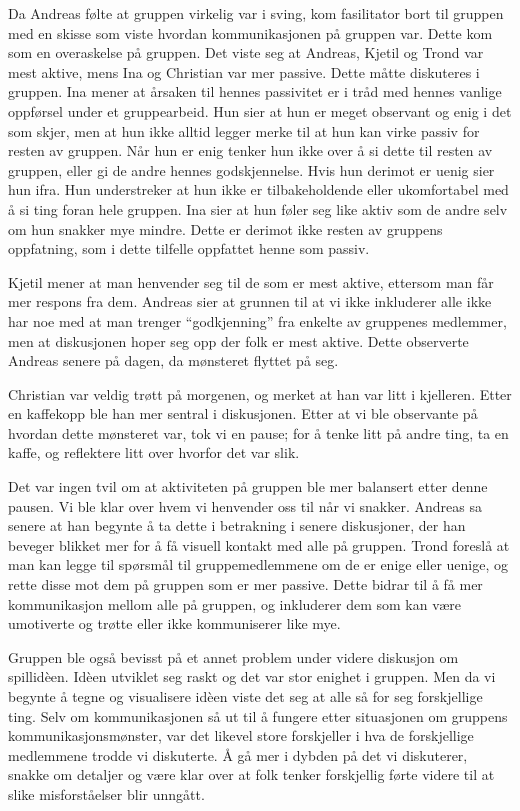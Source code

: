 Da Andreas følte at gruppen virkelig var i sving, kom fasilitator bort til gruppen med en skisse som viste hvordan kommunikasjonen på gruppen var.
Dette kom som en overaskelse på gruppen. Det viste seg at Andreas, Kjetil og Trond var mest aktive, mens Ina og Christian var mer passive. Dette måtte diskuteres i gruppen.
Ina mener at årsaken til hennes passivitet er i tråd med hennes vanlige oppførsel under et gruppearbeid. Hun sier at hun er meget observant og enig i det som skjer, men at hun ikke alltid legger merke til at hun kan virke passiv for resten av gruppen. Når hun er enig tenker hun ikke over å si dette til resten av gruppen, eller gi de andre hennes godskjennelse. Hvis hun derimot er uenig sier hun ifra. Hun understreker at hun ikke er tilbakeholdende eller ukomfortabel med å si ting foran hele gruppen. Ina sier at hun føler seg like aktiv som de andre selv om hun snakker mye mindre. Dette er derimot ikke resten av gruppens oppfatning, som i dette tilfelle oppfattet henne som passiv. 

Kjetil mener at man henvender seg til de som er mest aktive, ettersom man får mer respons fra dem. Andreas sier at grunnen til at vi ikke inkluderer alle ikke har noe med at man trenger “godkjenning” fra enkelte av gruppenes medlemmer, men at diskusjonen hoper seg opp der folk er mest aktive. Dette observerte Andreas senere på dagen, da mønsteret flyttet på seg. 

Christian var veldig trøtt på morgenen, og merket at han var litt i kjelleren. Etter en kaffekopp ble han mer sentral i diskusjonen. Etter at vi ble observante på hvordan dette mønsteret var, tok vi en pause; for å tenke litt på andre ting, ta en kaffe, og reflektere litt over hvorfor det var slik. 

Det var ingen tvil om at aktiviteten på gruppen ble mer balansert etter denne pausen. Vi ble klar over hvem vi henvender oss til når vi snakker. Andreas sa senere at han begynte å ta dette i betrakning i senere diskusjoner, der han beveger blikket mer for å få visuell kontakt med alle på gruppen. Trond foreslå at man kan legge til spørsmål til gruppemedlemmene om de er enige eller uenige, og rette disse mot dem på gruppen som er mer passive. Dette bidrar til å få mer kommunikasjon mellom alle på gruppen, og inkluderer dem som kan være umotiverte og trøtte eller ikke kommuniserer like mye. 

Gruppen ble også bevisst på et annet problem under videre diskusjon om spillidèen. Idèen utviklet seg raskt og det var stor enighet i gruppen. Men da vi begynte å tegne og visualisere idèen viste det seg at alle så for seg forskjellige ting. Selv om kommunikasjonen så ut til å fungere etter situasjonen om gruppens kommunikasjonsmønster, var det likevel store forskjeller i hva de forskjellige medlemmene trodde vi diskuterte. Å gå mer i dybden på det vi diskuterer, snakke om detaljer og være klar over at folk tenker forskjellig førte videre til at slike misforståelser blir unngått.


 \cite{Johnson}